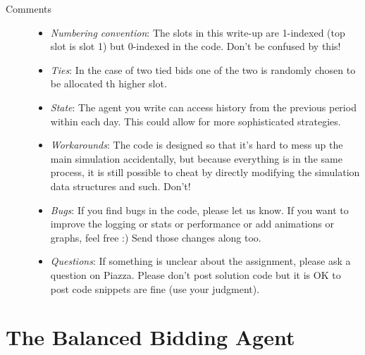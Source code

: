 \documentclass[11pt]{article}
\begin{document}
\begin{description}
\item[Comments]
\begin{itemize}
\item {\em Numbering convention}: The slots in this write-up are 1-indexed
(top slot is slot 1) but 0-indexed in the code. Don't be confused by this!    		
%
\item {\em Ties}: In the case of two tied bids one of the two is randomly chosen to be allocated th higher slot.
%
\item
{\em State}: The agent you write can access history from the previous period within each day. 
This could allow for more sophisticated strategies.


\item {\em Workarounds}: The code is designed so that it's hard to mess up the main simulation accidentally, but because everything is in the same process, it is still possible to cheat by directly modifying the simulation data structures and such. Don't!
%
		\item {\em Bugs}: If you find bugs in the code,
please let us know. If you want to improve the logging or stats or performance or add animations or graphs, feel free :) Send those changes along too.
%
    		\item {\em Questions}:
If something is unclear about the assignment, please ask a question on Piazza. Please don't post solution code but it is OK
to post code snippets are fine (use your judgment).
    	\end{itemize}
	\end{description}
	

\section{The Balanced Bidding Agent}
\end{document}
